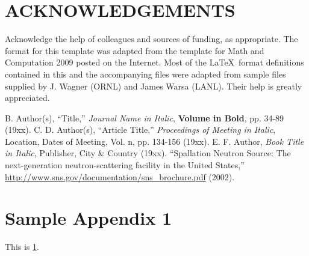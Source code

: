 \documentclass{physor2012}
\begin{document}
\section*{ACKNOWLEDGEMENTS}
%
Acknowledge the help of colleagues and sources of funding, as appropriate.
%
The format for this template was adapted from the template for Math and Computation 2009 
posted on the Internet.  Most of the \LaTeX\ format definitions contained
in this and the accompanying files were adapted from sample files supplied 
by J. Wagner (ORNL) and James Warsa (LANL). Their help is greatly appreciated.
%
% 
% 
% 
\setlength{\baselineskip}{12pt}
\begin{thebibliography}{300}
 B. Author(s), ``Title,'' \emph{Journal Name in Italic}, 
  \textbf{Volume in Bold}, pp. 34-89 (19xx).
 C. D. Author(s), ``Article Title,'' \emph{Proceedings of
  Meeting in Italic}, Location, Dates of Meeting, Vol. n, pp. 134-156 
  (19xx).
 E. F. Author, \emph{Book Title in Italic}, Publisher, City \&
  Country (19xx). 
 ``Spallation Neutron Source: The next-generation 
  neutron-scattering facility in the United States,'' 
  \url{http://www.sns.gov/documentation/sns\_brochure.pdf} (2002).
\end{thebibliography}

\appendix
\gdef\thesection{APPENDIX \Alph{section}}
\section{Sample Appendix 1}
\label{app:a}
This is \ref{app:a}. 
\end{document}
